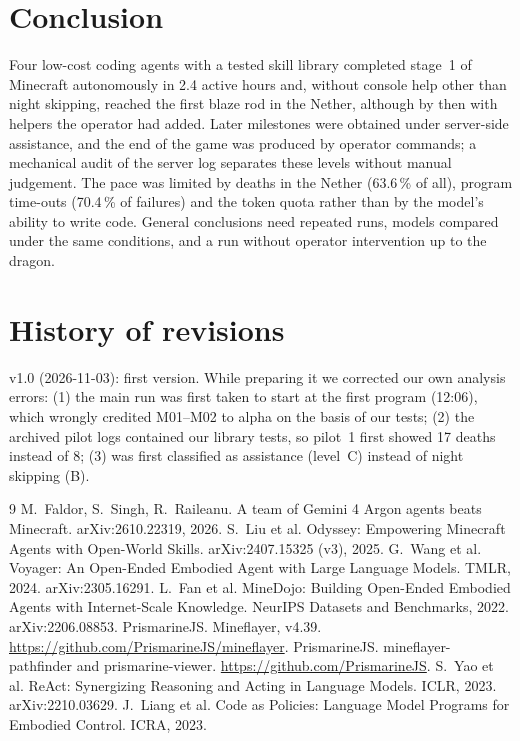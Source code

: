 \documentclass[11pt]{article}
\begin{document}
\section{Conclusion}
Four low-cost coding agents with a tested skill library completed stage~1 of Minecraft autonomously in 2.4 active hours and, without console help other than night skipping, reached the first blaze rod in the Nether, although by then with helpers the operator had added. Later milestones were obtained under server-side assistance, and the end of the game was produced by operator commands; a mechanical audit of the server log separates these levels without manual judgement. The pace was limited by deaths in the Nether (63.6\,\% of all), program time-outs (70.4\,\% of failures) and the token quota rather than by the model's ability to write code. General conclusions need repeated runs, models compared under the same conditions, and a run without operator intervention up to the dragon.

\section{History of revisions}
v1.0 (2026-11-03): first version. While preparing it we corrected our own analysis errors: (1) the main run was first taken to start at the first program (12:06), which wrongly credited M01--M02 to alpha on the basis of our tests; (2) the archived pilot logs contained our library tests, so pilot~1 first showed 17 deaths instead of 8; (3)  was first classified as assistance (level~C) instead of night skipping (B).

\begin{thebibliography}{9}
 M.~Faldor, S.~Singh, R.~Raileanu. A team of Gemini 4 Argon agents beats Minecraft. arXiv:2610.22319, 2026.
 S.~Liu et al. Odyssey: Empowering Minecraft Agents with Open-World Skills. arXiv:2407.15325 (v3), 2025.
 G.~Wang et al. Voyager: An Open-Ended Embodied Agent with Large Language Models. TMLR, 2024. arXiv:2305.16291.
 L.~Fan et al. MineDojo: Building Open-Ended Embodied Agents with Internet-Scale Knowledge. NeurIPS Datasets and Benchmarks, 2022. arXiv:2206.08853.
 PrismarineJS. Mineflayer, v4.39. \url{https://github.com/PrismarineJS/mineflayer}.
 PrismarineJS. mineflayer-pathfinder and prismarine-viewer. \url{https://github.com/PrismarineJS}.
 S.~Yao et al. ReAct: Synergizing Reasoning and Acting in Language Models. ICLR, 2023. arXiv:2210.03629.
 J.~Liang et al. Code as Policies: Language Model Programs for Embodied Control. ICRA, 2023.
\end{thebibliography}
\end{document}
